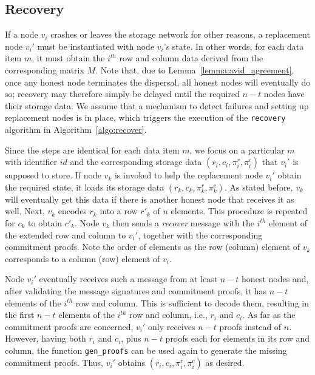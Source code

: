 \documentclass[sigconf,screen]{acmart}
\begin{document}
\subsection{Recovery}

If a node $v_i$ crashes or leaves the storage network for other reasons, a replacement node $v_i'$ must be instantiated with node $v_i$'s state. In other words, for each data item $m$, it must obtain the $i^\mathit{th}$ row and column data derived from the corresponding matrix $M$. Note that, due to Lemma~\ref{lemma:avid_agreement}, once any honest node terminates the dispersal, all honest nodes will eventually do so; recovery may therefore simply be delayed until the required $n-t$ nodes have their storage data.
We assume that a mechanism to detect failures and setting up replacement nodes is in place, which triggers the execution of the \texttt{recovery} algorithm in Algorithm~\ref{algo:recover}.

Since the steps are identical for each data item $m$, we focus on a particular $m$ with identifier $id$ and the corresponding storage data $(r_i, c_i, \pi^r_{i}, \pi^c_{i})$ that $v_i'$ is supposed to store.
If node $v_k$ is invoked to help the replacement node $v_i'$ obtain the required state, it loads its storage data $(r_k, c_k, \pi^r_{k}, \pi^c_{k})$. As stated before, $v_k$ will eventually get this data if there is another honest node that receives it as well. Next, $v_k$ encodes $r_k$ into a row $r'_k$ of $n$ elements. This procedure is repeated for $c_k$ to obtain $c'_k$.
Node $v_k$ then sends a \emph{recover} message with the $i^\mathit{th}$ element of the extended row and column to $v_i'$, together with the corresponding commitment proofs. Note the order of elements as the row (column) element of $v_k$ corresponds to a column (row) element of $v_i$.

Node $v_i'$ eventually receives such a message from at least $n-t$ honest nodes and, after validating the message signatures and commitment proofs, it has $n-t$ elements of the $i^\mathit{th}$ row and column. This is sufficient to decode them, resulting in the first $n-t$ elements of the $i^\mathit{th}$ row and column, i.e., $r_i$ and $c_i$.
As far as the commitment proofs are concerned, $v_i'$ only receives $n-t$ proofs instead of $n$. However, having both $r_i$ and $c_i$, plus $n-t$ proofs each for elements in its row and column, the function \texttt{gen\_proofs} can be used again to generate the missing commitment proofs. Thus, $v_i'$ obtains $(r_i, c_i, \pi^r_{i}, \pi^c_{i})$ as desired.
\end{document}
